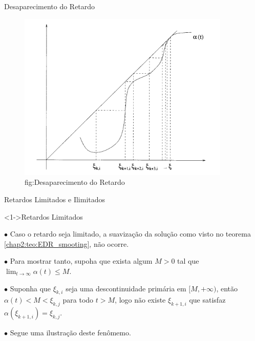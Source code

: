 \documentclass{beamer}
\theoremstyle{plain}
\theoremstyle{definition}
\begin{document}

\begin{frame}{Desaparecimento do Retardo}
    

    \begin{figure}
        \begin{center}
            \includegraphics[width=0.9\textwidth, height=0.7\textheight]{desaparecimento_do_retardo.png}
        \end{center}
        \caption{fig:Desaparecimento do Retardo}\label{fig:Desaparecimento do Retardo}
    \end{figure}
        

\end{frame}



\begin{frame}{Retardos Limitados e Ilimitados}

    \begin{exampleblock}
        <1->{Retardos Limitados}

        $\bullet$ Caso o retardo seja limitado, a suavização da solução como visto no teorema \ref{chap2:teo:EDR_smooting}, não ocorre.


        $\bullet$ Para mostrar tanto, supoha que exista algum $M>0$ tal que \( \lim_{t \to \infty} \alpha(t) \leq M \).

        $\bullet$ Suponha que $\xi_{k, i}$ seja uma descontinuidade primária em $[M, +\infty)$, então $\alpha(t) < M < \xi_{k, j}$ para todo $t > M$, logo não existe $\xi_{k+1, i}$ que satisfaz $\alpha(\xi_{k+1, i}) = \xi_{k, j}$.
        
        $\bullet$ Segue uma ilustração deste fenômemo.

    \end{exampleblock}

\end{frame}
\end{document}
